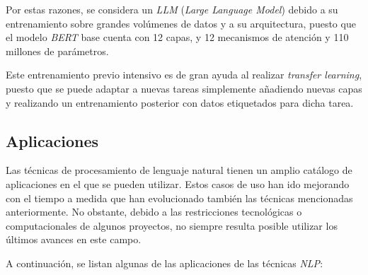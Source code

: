 \begin{itemize}
    
    Por estas razones, se considera un \textit{LLM} (\textit{Large Language Model}) debido a su entrenamiento sobre grandes volúmenes de datos y a su arquitectura, puesto que el modelo \textit{BERT} base cuenta con 12 capas, y 12 mecanismos de atención y 110 millones de parámetros.
    
    Este entrenamiento previo intensivo es de gran ayuda al realizar \textit{transfer learning}, puesto que se puede adaptar a nuevas tareas simplemente añadiendo nuevas capas y realizando un entrenamiento posterior con datos etiquetados para dicha tarea.
   
\end{itemize}

\subsection{Aplicaciones}

Las técnicas de procesamiento de lenguaje natural tienen un amplio catálogo de aplicaciones en el que se pueden utilizar. Estos casos de uso han ido mejorando con el tiempo a medida que han evolucionado también las técnicas mencionadas anteriormente. No obstante, debido a las restricciones tecnológicas o computacionales de algunos proyectos, no siempre resulta posible utilizar los últimos avances en este campo.

A continuación, se listan algunas de las aplicaciones de las técnicas \textit{NLP}:

